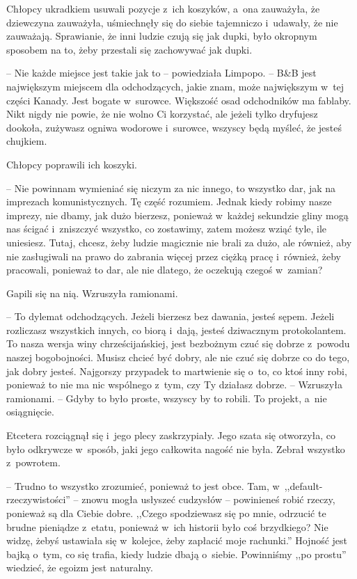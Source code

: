 \documentclass[oneside,polish,11pt,sfheadings]{mwbk}
\begin{document}
Chłopcy ukradkiem usuwali pozycje z~ich koszyków, a~ona zauważyła, że
dziewczyna zauważyła, uśmiechnęły się do siebie tajemniczo i~udawały, że
nie zauważają. Sprawianie, że inni ludzie czują się jak dupki, było
okropnym sposobem na to, żeby przestali się zachowywać jak dupki.

-- Nie każde miejsce jest takie jak to -- powiedziała Limpopo. -- B\&B jest
największym miejscem dla odchodzących, jakie znam, może największym w~tej części Kanady. Jest bogate w~surowce. Większość osad odchodników ma
fablaby. Nikt nigdy nie powie, że nie wolno Ci korzystać, ale jeżeli
tylko dryfujesz dookoła, zużywasz ogniwa wodorowe i~surowce, wszyscy
będą myśleć, że jesteś chujkiem.

Chłopcy poprawili ich koszyki.

-- Nie powinnam wymieniać się niczym za
nic innego, to wszystko dar, jak na imprezach komunistycznych. Tę część
rozumiem. Jednak kiedy robimy nasze imprezy, nie dbamy, jak dużo
bierzesz, ponieważ w~każdej sekundzie gliny mogą nas ścigać i~zniszczyć
wszystko, co zostawimy, zatem możesz wziąć tyle, ile uniesiesz. Tutaj,
chcesz, żeby ludzie magicznie nie brali za dużo, ale również, aby nie
zasługiwali na prawo do zabrania więcej przez ciężką pracę i~również,
żeby pracowali, ponieważ to dar, ale nie dlatego, że oczekują czegoś w~zamian?

Gapili się na nią. Wzruszyła ramionami. 

-- To dylemat odchodzących.
Jeżeli bierzesz bez dawania, jesteś sępem. Jeżeli rozliczasz wszystkich
innych, co biorą i~dają, jesteś dziwacznym protokolantem. To nasza
wersja winy chrześcijańskiej, jest bezbożnym czuć się dobrze z~powodu
naszej bogobojności. Musisz chcieć być dobry, ale nie czuć się dobrze co
do tego, jak dobry jesteś. Najgorszy przypadek to martwienie się o~to,
co ktoś inny robi, ponieważ to nie ma nic wspólnego z~tym, czy Ty
działasz dobrze. -- Wzruszyła ramionami. -- Gdyby to było proste, wszyscy
by to robili. To projekt, a~nie osiągnięcie.

Etcetera rozciągnął się i~jego plecy zaskrzypiały. Jego szata się
otworzyła, co było odkrywcze w~sposób, jaki jego całkowita nagość nie
była. Zebrał wszystko z~powrotem. 

-- Trudno to wszystko zrozumieć,
ponieważ to jest obce. Tam, w~,,default-rzeczywistości'' -- znowu mogła
usłyszeć cudzysłów -- powinieneś robić rzeczy, ponieważ są dla Ciebie
dobre. ,,Czego spodziewasz się po mnie, odrzucić te brudne pieniądze z~etatu, ponieważ w~ich historii było coś brzydkiego? Nie widzę, żebyś
ustawiała się w~kolejce, żeby zapłacić moje rachunki.'' Hojność jest
bajką o~tym, co się trafia, kiedy ludzie dbają o~siebie. Powinniśmy ,,po
prostu'' wiedzieć, że egoizm jest naturalny.
\end{document}
